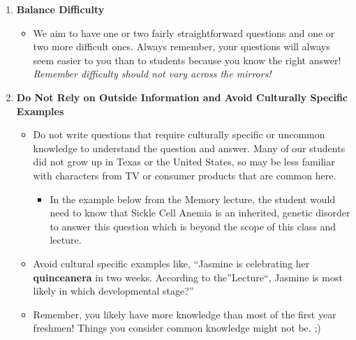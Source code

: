 \documentclass[
]{article}
\providecommand{\tightlist}{%
  \setlength{\itemsep}{0pt}\setlength{\parskip}{0pt}}
\begin{document}
\begin{enumerate}
\def\labelenumi{\arabic{enumi}.}
\setcounter{enumi}{3}
\tightlist
\item
  \textbf{Balance Difficulty}

  \begin{itemize}
  \tightlist
  \item
    We aim to have one or two fairly straightforward questions and one or two more difficult ones. Always remember, your questions will always seem easier to you than to students because you know the right answer! \emph{Remember difficulty should not vary across the mirrors!}
  \end{itemize}
\item
  \textbf{Do Not Rely on Outside Information and Avoid Culturally Specific Examples}

  \begin{itemize}
  \tightlist
  \item
    Do not write questions that require culturally specific or uncommon knowledge to understand the question and answer. Many of our students did not grow up in Texas or the United States, so may be less familiar with characters from TV or consumer products that are common here.

    \begin{itemize}
    \tightlist
    \item
      In the example below from the Memory lecture, the student would need to know that Sickle Cell Anemia is an inherited, genetic disorder to answer this question which is beyond the scope of this class and lecture.
    \end{itemize}
  \item
    Avoid cultural specific examples like, ``Jasmine is celebrating her \textbf{quinceanera} in two weeks. According to the''Lecture``, Jasmine is most likely in which developmental stage?''
  \item
    Remember, you likely have more knowledge than most of the first year freshmen! Things you consider common knowledge might not be. ;)
  \end{itemize}
\end{enumerate}
\end{document}
